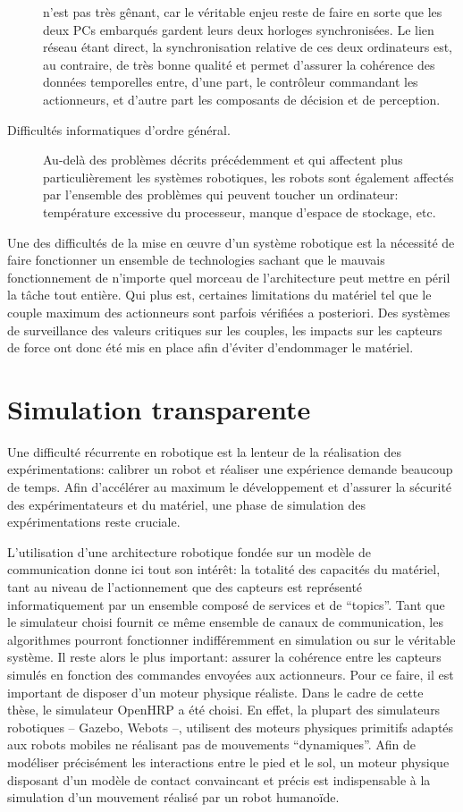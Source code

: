 \begin{description}
  n'est pas très gênant, car le véritable enjeu reste de faire en
  sorte que les deux PCs embarqués gardent leurs deux horloges
  synchronisées. Le lien réseau étant direct, la synchronisation
  relative de ces deux ordinateurs est, au contraire, de très bonne
  qualité et permet d'assurer la cohérence des données temporelles
  entre, d'une part, le contrôleur commandant les actionneurs, et
  d'autre part les composants de décision et de perception.
\item[Difficultés informatiques d'ordre général.] Au-delà des problèmes
  décrits précédemment et qui affectent plus particulièrement les
  systèmes robotiques, les robots sont également affectés par
  l'ensemble des problèmes qui peuvent toucher un ordinateur:
  température excessive du processeur, manque d'espace de stockage,
  etc.
\end{description}

Une des difficultés de la mise en \oe uvre d'un système robotique est
la nécessité de faire fonctionner un ensemble de technologies sachant
que le mauvais fonctionnement de n'importe quel morceau de
l'architecture peut mettre en péril la tâche tout entière. Qui plus
est, certaines limitations du matériel tel que le couple maximum des
actionneurs sont parfois vérifiées a posteriori. Des systèmes de
surveillance des valeurs critiques sur les couples, les impacts sur
les capteurs de force ont donc été mis en place afin d'éviter
d'endommager le matériel.


\section{Simulation transparente}


Une difficulté récurrente en robotique est la lenteur de la
réalisation des expérimentations: calibrer un robot et réaliser une
expérience demande beaucoup de temps. Afin d'accélérer au maximum le
développement et d'assurer la sécurité des expérimentateurs et du
matériel, une phase de simulation des expérimentations reste cruciale.


L'utilisation d'une architecture robotique fondée sur un modèle de
communication donne ici tout son intérêt: la totalité des capacités du
matériel, tant au niveau de l'actionnement que des capteurs est
représenté informatiquement par un ensemble composé de services et de
``topics''. Tant que le simulateur choisi fournit ce même ensemble de
canaux de communication, les algorithmes pourront fonctionner
indifféremment en simulation ou sur le véritable système. Il reste
alors le plus important: assurer la cohérence entre les capteurs
simulés en fonction des commandes envoyées aux actionneurs. Pour ce
faire, il est important de disposer d'un moteur physique
réaliste. Dans le cadre de cette thèse, le simulateur
OpenHRP a été choisi. En effet,
la plupart des simulateurs robotiques -- Gazebo, Webots --, utilisent
des moteurs physiques primitifs adaptés aux robots mobiles ne
réalisant pas de mouvements ``dynamiques''. Afin de modéliser
précisément les interactions entre le pied et le sol, un moteur
physique disposant d'un modèle de contact convaincant et précis est
indispensable à la simulation d'un mouvement réalisé par un robot
humanoïde.



